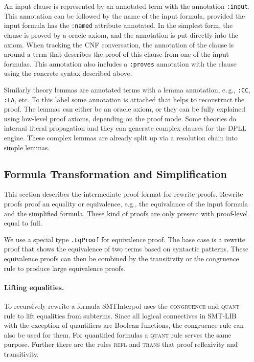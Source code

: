 \documentclass[a4paper]{article}
\newcommand\si{SMTInterpol\xspace}
\begin{document}
An input clause is represented by an annotated term with the annotation
\verb+:input+.  This annotation can be followed by the name of the input
formula, provided the input formula has the \verb+:named+ attribute
annotated.  In the simplest form, the clause is proved by a oracle
axiom, and the annotation is put directly into the axiom.  When
tracking the CNF conversation, the annotation of the clause is around
a term that describes the proof of this clause from one of the input
formulas.  This annotation also includes a \verb+:proves+ annotation
with the clause using the concrete syntax described above.

Similarly theory lemmas are annotated terms with a lemma annotation,
e.\,g., \texttt{:CC}, \texttt{:LA}, etc.  To this label some
annotation is attached that helps to reconstruct the proof.  The
lemmas can either be an oracle axiom, or they can be fully explained
using low-level proof axioms, depending on the proof mode.  Some
theories do internal literal propagation and they can generate complex
clauses for the DPLL engine.  These complex lemmas are already split up
via a resolution chain into simple lemmas.

\subsection{Formula Transformation and Simplification}
\label{simplayer}

This section describes the intermediate proof format for rewrite proofs.
Rewrite proofs proof an equality or equivalence, e.g., the equivalance
of the input formula and the simplified formula. These
kind of proofs are only present with proof-level equal to full.

We use a special type \verb+.EqProof+ for equivalence proof.
The base case is a rewrite proof that shows the equivalence of
two terms based on syntactic patterns.  These equivalence proofs
can then be combined by the transitivity or the congruence rule
to produce large equivalence proofs.

\paragraph{Lifting equalities.}  To recursively rewrite a formula
\si uses the \textsc{congruence} and \textsc{quant} rule to lift
equalities from subterms.  Since all logical connectives in SMT-LIB
with the exception of quantifiers are Boolean functions, the
congruence rule can also be used for them.  For quantified formulas a
\textsc{quant} rule serves the same purpose.  Further there are the
rules \textsc{refl} and \textsc{trans} that proof reflexivity and
transitivity.
\end{document}
